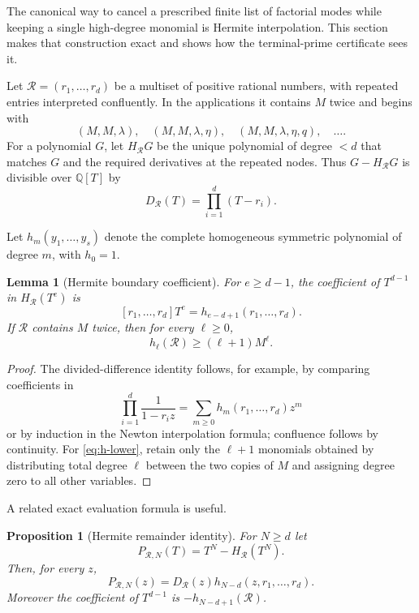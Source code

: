 \documentclass[11pt,oneside]{article}
\newtheorem{proposition}[theorem]{Proposition}
\newtheorem{lemma}[theorem]{Lemma}
\theoremstyle{definition}
\theoremstyle{remark}
\newcommand{\Q}{\mathbb Q}
\begin{document}
The canonical way to cancel a prescribed finite list of factorial modes while keeping a
single high-degree monomial is Hermite interpolation.  This section makes that construction
exact and shows how the terminal-prime certificate sees it.

Let $\mathcal R=(r_1,\ldots,r_d)$ be a multiset of positive rational numbers, with repeated
entries interpreted confluently.  In the applications it contains $M$ twice and begins with
\[
 (M,M,\lambda),\quad
 (M,M,\lambda,\eta),\quad
 (M,M,\lambda,\eta,q),\quad\ldots.
\]
For a polynomial $G$, let $H_{\mathcal R}G$ be the unique polynomial of degree $<d$ that
matches $G$ and the required derivatives at the repeated nodes.  Thus
$G-H_{\mathcal R}G$ is divisible over $\Q[T]$ by
\[
 D_{\mathcal R}(T)=\prod_{i=1}^d(T-r_i).
\]

Let $h_m(y_1,\ldots,y_s)$ denote the complete homogeneous symmetric polynomial of degree
$m$, with $h_0=1$.

\begin{lemma}[Hermite boundary coefficient]
\label{lem:hermite-boundary}
For $e\ge d-1$, the coefficient of $T^{d-1}$ in $H_{\mathcal R}(T^e)$ is
\[
 [r_1,\ldots,r_d]T^e=h_{e-d+1}(r_1,\ldots,r_d).
\]
If $\mathcal R$ contains $M$ twice, then for every $\ell\ge0$,
\begin{equation}
 h_\ell(\mathcal R)\ge(\ell+1)M^\ell.                \label{eq:h-lower}
\end{equation}
\end{lemma}

\begin{proof}
The divided-difference identity follows, for example, by comparing coefficients in
\[
 \prod_{i=1}^d\frac1{1-r_i z}=\sum_{m\ge0}h_m(r_1,\ldots,r_d)z^m
\]
or by induction in the Newton interpolation formula; confluence follows by continuity.
For \eqref{eq:h-lower}, retain only the $\ell+1$ monomials obtained by distributing total
degree $\ell$ between the two copies of $M$ and assigning degree zero to all other variables.
\end{proof}

A related exact evaluation formula is useful.

\begin{proposition}[Hermite remainder identity]
\label{prop:hermite-remainder}
For $N\ge d$ let
\[
 P_{\mathcal R,N}(T)=T^N-H_{\mathcal R}(T^N).
\]
Then, for every $z$,
\begin{equation}
 P_{\mathcal R,N}(z)=D_{\mathcal R}(z)
 h_{N-d}(z,r_1,\ldots,r_d).                           \label{eq:hermite-remainder}
\end{equation}
Moreover the coefficient of $T^{d-1}$ is
$-h_{N-d+1}(\mathcal R)$.
\end{proposition}
\end{document}
